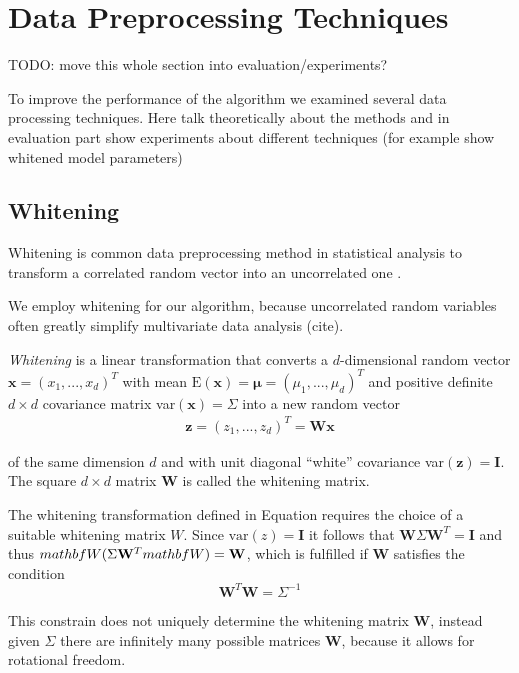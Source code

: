 \section{Data Preprocessing Techniques}
TODO: move this whole section into evaluation/experiments?

To improve the performance of the algorithm we examined several data processing techniques.
Here talk theoretically about the methods and in evaluation part
show experiments about different techniques (for example show whitened model
parameters)

\subsection{Whitening}
Whitening is common data preprocessing method in statistical analysis
to transform a correlated random vector into an uncorrelated one
\citet{kessy2018optimal}.

We employ whitening for our algorithm, because uncorrelated
random variables often greatly simplify  multivariate data analysis (cite).

\textit{Whitening} is a linear transformation that converts a $d$-dimensional
random vector $\mathbf{x} = (x_1,...,x_d)^T$ with mean
$\text{E}(\mathbf{x}) = \mathbf{\mu} = (\mu_1,...,\mu_d)^T$ and
positive definite $d \times d$ covariance matrix
var$(\mathbf{x}) = \Sigma$ into a new random vector
\begin{align}
  \label{whitening}
 \mathbf{z} = (z_1,...,z_d)^T = \mathbf{W}\mathbf{x}
\end{align}

of the same dimension $d$ and with unit diagonal ``white'' covariance
var$(\mathbf{z}) = \mathbf{I}$. The square $d \times d$
matrix $\mathbf{W}$ is called the whitening matrix.

The whitening transformation defined in Equation  requires
the choice of a suitable whitening matrix $W$.
Since $\text{var}(z) = \mathbf{I}$ it follows that
$\mathbf{W}\Sigma \mathbf{W}^T = \mathbf{I}$ and thus
$\\mathbf{W}(\Sigma \mathbf{W}^T\\mathbf{W}) = \mathbf{W}$, which
is fulfilled if $\mathbf{W}$ satisfies the condition
$$ \mathbf{W}^T \mathbf{W} = \Sigma^{-1} $$

This constrain does not uniquely determine the whitening
matrix $\mathbf{W}$, instead given $\Sigma$ there are infinitely many
possible matrices $\mathbf{W}$, because it allows for rotational freedom.

